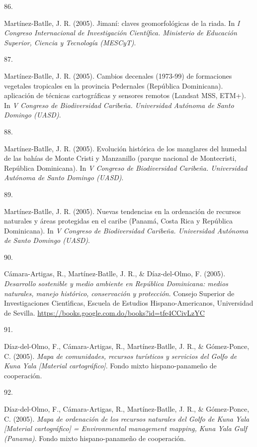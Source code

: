 \documentclass[10pt,a4paper,]{article}
\newlength{\cslhangindent}
\newlength{\csllabelwidth}
\newcommand{\CSLLeftMargin}[1]{\parbox[t]{\csllabelwidth}{\hfill #1~}}
\newcommand{\CSLRightInline}[1]{\parbox[t]{\linewidth - \cslhangindent - \csllabelwidth}{#1}\vspace{0.8ex}}
\begin{document}
\leavevmode\hypertarget{ref-Jose_Ramon_Martinez-Batlle_108102743}{}%
\CSLLeftMargin{86. }
\CSLRightInline{Martínez-Batlle, J. R. (2005). Jimaní: claves
geomorfológicas de la riada. In \emph{I Congreso Internacional de
Investigación Científica. Ministerio de Educación Superior, Ciencia y
Tecnología (MESCyT)}.}

\leavevmode\hypertarget{ref-Jose_Ramon_Martinez-Batlle_108102772}{}%
\CSLLeftMargin{87. }
\CSLRightInline{Martínez-Batlle, J. R. (2005). Cambios decenales
(1973-99) de formaciones vegetales tropicales en la provincia Pedernales
(República Dominicana). aplicación de técnicas cartográficas y sensores
remotos (Landsat MSS, ETM+). In \emph{V Congreso de Biodiversidad
Caribeña. Universidad Autónoma de Santo Domingo (UASD)}.}

\leavevmode\hypertarget{ref-Jose_Ramon_Martinez-Batlle_108102787}{}%
\CSLLeftMargin{88. }
\CSLRightInline{Martínez-Batlle, J. R. (2005). Evolución histórica de
los manglares del humedal de las bahías de Monte Cristi y Manzanillo
(parque nacional de Montecristi, República Dominicana). In \emph{V
Congreso de Biodiversidad Caribeña. Universidad Autónoma de Santo
Domingo (UASD)}.}

\leavevmode\hypertarget{ref-Jose_Ramon_Martinez-Batlle_108102793}{}%
\CSLLeftMargin{89. }
\CSLRightInline{Martínez-Batlle, J. R. (2005). Nuevas tendencias en la
ordenación de recursos naturales y áreas protegidas en el caribe
(Panamá, Costa Rica y República Dominicana). In \emph{V Congreso de
Biodiversidad Caribeña. Universidad Autónoma de Santo Domingo (UASD)}.}

\leavevmode\hypertarget{ref-artigas2005desarrollo}{}%
\CSLLeftMargin{90. }
\CSLRightInline{Cámara-Artigas, R., Martínez-Batlle, J. R., \&
Díaz-del-Olmo, F. (2005). \emph{Desarrollo sostenible y medio ambiente
en República Dominicana: medios naturales, manejo histórico,
conservación y protección}. Consejo Superior de Investigaciones
Cientı́ficas, Escuela de Estudios Hispano-Americanos, Universidad de
Sevilla. \url{https://books.google.com.do/books?id=tfe4CCivLzYC}}

\leavevmode\hypertarget{ref-2005Mdcr}{}%
\CSLLeftMargin{91. }
\CSLRightInline{Díaz-del-Olmo, F., Cámara-Artigas, R., Martínez-Batlle,
J. R., \& Gómez-Ponce, C. (2005). \emph{Mapa de comunidades, recursos
turísticos y servicios del Golfo de Kuna Yala {[}Material
cartográfico{]}}. Fondo mixto hispano-panameño de cooperación.}

\leavevmode\hypertarget{ref-2005Mdod}{}%
\CSLLeftMargin{92. }
\CSLRightInline{Díaz-del-Olmo, F., Cámara-Artigas, R., Martínez-Batlle,
J. R., \& Gómez-Ponce, C. (2005). \emph{Mapa de ordenación de los
recursos naturales del Golfo de Kuna Yala {[}Material cartográfico{]} =
Environmental management mapping, Kuna Yala Gulf (Panama)}. Fondo mixto
hispano-panameño de cooperación.}
\end{document}
